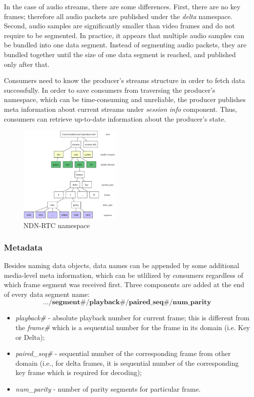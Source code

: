 \documentclass{icn/sig-alternate-2012} %
\newcommand{\ndnrtcName}{NDN-RTC} %
\begin{document}
In the case of audio streams, there are some differences. First, there are no key frames; therefore all audio packets are published under the \textit{delta} namespace. Second, audio samples are significantly smaller than video frames and do not require to be segmented. In practice, it appears that multiple audio samples can be bundled into one data segment. Instead of segmenting audio packets, they are bundled together until the size of one data segment is reached, and published only after that.

Consumers need to know the producer's streams structure in order to fetch data successfully. In order to save consumers from traversing the producer's namespace, which can be time-consuming and unreliable, the producer publishes meta information about current streams under \textit{session info} component. Thus, consumers can retrieve up-to-date information about the producer's state.

\begin{figure}[t!]
\centering
\includegraphics[width=0.45\textwidth]{namespace}
\caption{\ndnrtcName{} namespace}
\label{fig:namespace}
\end{figure}

\subsubsection{Metadata} 

Besides naming data objects, data names can be appended by some additional media-level meta information, which can be utlilized by consumers regardless of which frame segment was received first. Three components are added at the end of every data segment name:
\small\begin{equation}
.../\textbf{segment\#}/\textbf{playback\#}/\textbf{paired\_seq\#}/\textbf{num\_parity} \nonumber
\end{equation}\normalsize
\begin{itemize}[label={}]
\item \textit{playback\#} - absolute playback number for current frame; this is different from the \textit{frame\#} which is a sequential number for the frame in its domain (i.e. Key or Delta);
\item \textit{paired\_seq\#} - sequential number of the corresponding frame from other domain (i.e., for delta frames, it is sequential number of the corresponding key frame which is required for decoding);
\item \textit{num\_parity} - number of parity segments for particular frame.
\end{itemize}
\end{document}
